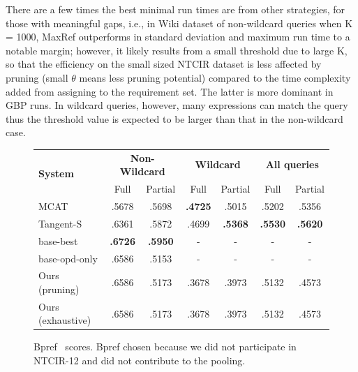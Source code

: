 \documentclass[runningheads]{llncs}
\begin{document}
There are a few times the best minimal run times are from other strategies, for those with meaningful gaps, i.e., in Wiki dataset of non-wildcard queries when K = 1000, MaxRef outperforms in standard deviation and maximum run time to a notable margin; however, it likely results from a small threshold due to large K, so that the efficiency on the small sized NTCIR dataset is less affected by pruning (small $\theta$ means less pruning potential) compared to the time complexity added from assigning to the requirement set. The latter is more dominant in GBP runs. In wildcard queries, however, many expressions can match the query thus the threshold value is expected to be larger than that in the non-wildcard case.
\begin{figure}[]
\begin{center}


	\begin{tabular}{l|cc|cc|cc}
	\toprule
	\multirow{2}{*}{\bf{System}}
	& \multicolumn{2}{c|}{\bf Non-Wildcard}
	& \multicolumn{2}{c|}{\bf Wildcard}
	& \multicolumn{2}{c}{\bf All queries} \\
	& Full& Partial
	& Full& Partial
	& Full& Partial \\
 	\toprule
 	MCAT                &     .5678 &     .5698 & \bf .4725 &     .5015 &     .5202 &     .5356 \\
{Tangent-S} &     .6361 &     .5872 &     .4699 & \bf .5368 & \bf .5530 & \bf .5620 \\
{base-best} & \bf .6726 & \bf .5950 &     -     &      -    &      -    &       -   \\
{base-opd-only} & .6586 &   .5153 &     -     &      -    &      -    &       -   \\
 	Ours (pruning)&     .6586 &     .5173 &     .3678 &     .3973 &     .5132 &     .4573 \\
 	Ours (exhaustive)&     .6586 &     .5173 &     .3678 &     .3973 &     .5132 &     .4573 \\
 	\bottomrule
	\end{tabular}

\end{center}
\caption{Bpref~\cite{buckley2004retrieval} scores. Bpref chosen because we did not participate in NTCIR-12 and did not contribute to the pooling.
}
\label{bpref}
\end{figure}
\end{document}
